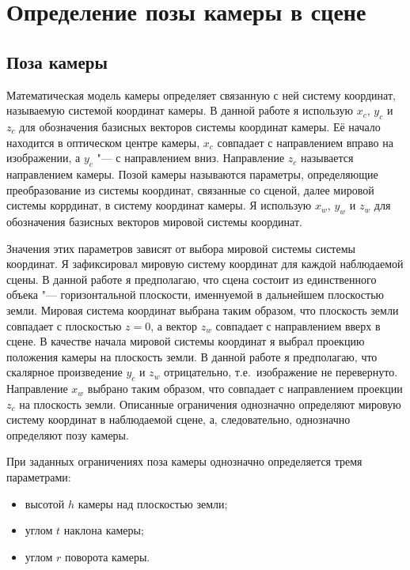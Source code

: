 \def\slantfrac#1#2{ \hspace{3pt}\!^{#1}\!\!\hspace{1pt}/
	\hspace{2pt}\!\!_{#2}\!\hspace{3pt}
} %

\chapter{Определение позы камеры в сцене} \label{chapt1}

\section{Поза камеры}
Математическая модель камеры определяет связанную с ней систему координат, называемую системой координат камеры. В данной работе я использую $x_c$, $y_c$ и $z_c$ для обозначения базисных векторов системы координат камеры. Её начало находится в оптическом центре камеры, $x_c$ совпадает с направлением вправо на изображении, а $y_c$ "--- с направлением вниз. Направление $z_c$ называется направлением камеры. Позой камеры называются параметры, определяющие преобразование из системы координат, связанные со сценой, далее мировой системы коррдинат, в систему координат камеры. Я использую $x_w$, $y_w$ и $z_w$ для обозначения базисных векторов мировой системы координат.

Значения этих параметров зависят от выбора мировой системы системы координат. Я зафиксировал мировую систему координат для каждой наблюдаемой сцены. В данной работе я предполагаю, что сцена состоит из единственного объека "--- горизонтальной плоскости, именнуемой в дальнейшем плоскостью земли. Мировая система координат выбрана таким образом, что плоскость земли совпадает с плоскостью $z=0$, а вектор $z_w$ совпадает с направлением вверх в сцене. В качестве начала мировой системы координат я выбрал проекцию положения камеры на плоскость земли. В данной работе я предполагаю, что скалярное произведение $y_c$ и $z_w$ отрицательно, т.е.~изображение не перевернуто. Направление $x_w$ выбрано таким образом, что совпадает с направлением проекции $z_c$ на плоскость земли.  Описанные ограничения однозначно определяют мировую систему координат в наблюдаемой сцене, а, следовательно, однозначно определяют позу камеры.

При заданных ограничениях поза камеры однозначно определяется тремя параметрами:
\begin{itemize}
	\item высотой $h$ камеры над плоскостью земли;
	\item углом $t$ наклона камеры;
	\item углом $r$ поворота камеры.
\end{itemize}

